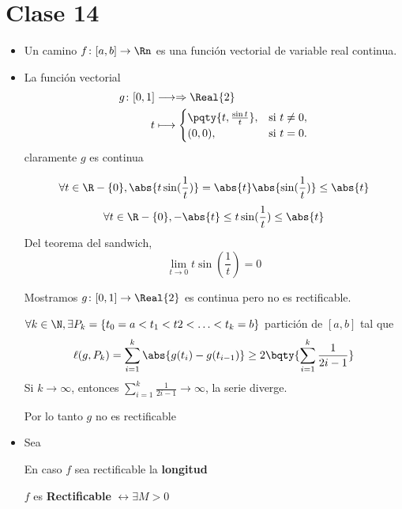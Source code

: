 \chapter{Clase 14}

\begin{itemize}
	\item Un camino $f \colon [a, b] \to \Rn$ es una función vectorial de variable real continua.
	\item La función vectorial
	\begin{align*}
		g \colon [0, 1] & \longrightarrow \Rightarrow \Real{2}\\
		t & \longmapsto \begin{cases} \pqty{t,\frac{\sin t}{t}}, & \text{si } t \neq 0, \\
			(0,0),  & \text{si } t = 0.
		\end{cases}
	\end{align*}
	claramente $g$ es continua 
	
	$$
	\forall t \in \R -\{0\}, \abs{t \sin(\frac{1}{t})} = \abs{t} \abs{\sin(\frac{1}{t}) } \leq \abs{t}
	$$
	$$
	\forall t \in \R -\{0\}, - \abs{t}\leq t \sin(\frac{1}{t})\leq   \abs{t}
	$$
	Del teorema del sandwich, 
	$$
	\lim\limits_{t \to 0  }  t \sin(\frac{1}{t}) =0
	$$
	
	Mostramos $g\colon [0, 1] \to \Real{2}$ es continua pero no es rectificable.
	
	$\forall k \in \N, \exists P_k = \{t_0=a<t_1<t2< \ldots< t_k=b\}$  partición de $[a, b]$ tal que
	$$ 
	  \ell  (g, P_k ) = \sum_{i=1}^{k} \abs{g(t_i)-g(t_{i-1})} \geq 2 \bqty{\sum_{i=1}^{k} \frac{1}{2i-1}}
	$$
	Si \( k \to \infty \), entonces \( \sum_{i=1}^{k} \frac{1}{2i - 1} \to \infty \),  la serie diverge.
	
	
	Por lo tanto $g$ no es rectificable
	
	\item Sea 
	
	
	En caso $f$ sea rectificable la \textbf{longitud }
	
	$f$ es \textbf{Rectificable} $\leftrightarrow \exists M>0$
	
	
	
\end{itemize}
\newpage

